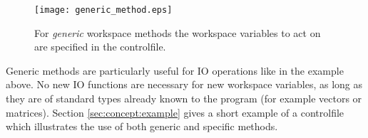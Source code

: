 \begin{figure}
  \begin{center}
    \texttt{[image: generic\_method.eps]}
    \caption{For \emph{generic}
      workspace methods the workspace variables to act on are
        specified in the controlfile.}
    \label{fig:generic_method}
  \end{center}
\end{figure}

Generic methods are particularly useful for IO operations like in the
example above. No new IO functions are necessary for new workspace
variables, as long as they are of standard types already known to the
program (for example vectors or matrices).  Section
\ref{sec:concept:example} gives a short example of a controlfile which
illustrates the use of both generic and specific methods.

\label{sec:concept:example}

